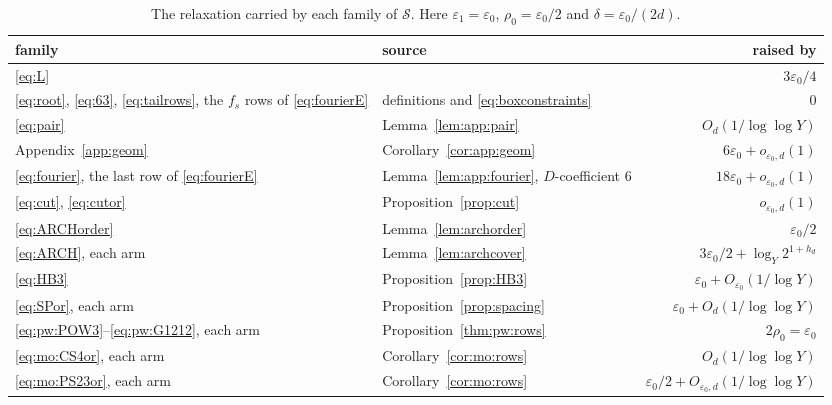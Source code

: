 \documentclass{amsart}
\theoremstyle{definition}
\theoremstyle{plain}
\numberwithin{equation}{section}
\numberwithin{table}{section}
\begin{document}
\begin{table}[ht]
\centering\small
\caption{The relaxation carried by each family of $\mathcal S$. Here
$\varepsilon_1=\varepsilon_0$, $\rho_0=\varepsilon_0/2$ and
$\delta=\varepsilon_0/(2d)$.}\label{tab:rho}
\begin{tabular}{@{}p{}p{}r@{}}
\hline family & source & raised by\\\hline
\eqref{eq:L} & \cite[(6.1)]{BBLT} & $3\varepsilon_0/4$\\
\eqref{eq:root}, \eqref{eq:63}, \eqref{eq:tailrows}, the $f_s$ rows of \eqref{eq:fourierE} & definitions and \eqref{eq:boxconstraints} & $0$\\
\eqref{eq:pair} & Lemma~\ref{lem:app:pair} & $O_d(1/\log\log Y)$\\
Appendix~\ref{app:geom} & Corollary~\ref{cor:app:geom} & $6\varepsilon_0+o_{\varepsilon_0,d}(1)$\\
\eqref{eq:fourier}, the last row of \eqref{eq:fourierE} & Lemma~\ref{lem:app:fourier}, $D$-coefficient $6$ & $18\varepsilon_0+o_{\varepsilon_0,d}(1)$\\
\eqref{eq:cut}, \eqref{eq:cutor} & Proposition~\ref{prop:cut} & $o_{\varepsilon_0,d}(1)$\\
\eqref{eq:ARCHorder} & Lemma~\ref{lem:archorder} & $\varepsilon_0/2$\\
\eqref{eq:ARCH}, each arm & Lemma~\ref{lem:archcover} & $3\varepsilon_0/2+\log_Y2^{1+h_d}$\\
\eqref{eq:HB3} & Proposition~\ref{prop:HB3} & $\varepsilon_0+O_{\varepsilon_0}(1/\log Y)$\\
\eqref{eq:SPor}, each arm & Proposition~\ref{prop:spacing} & $\varepsilon_0+O_d(1/\log\log Y)$\\
\eqref{eq:pw:POW3}--\eqref{eq:pw:G1212}, each arm & Proposition~\ref{thm:pw:rows} & $2\rho_0=\varepsilon_0$\\
\eqref{eq:mo:CS4or}, each arm & Corollary~\ref{cor:mo:rows} & $O_d(1/\log\log Y)$\\
\eqref{eq:mo:PS23or}, each arm & Corollary~\ref{cor:mo:rows} & $\varepsilon_0/2+O_{\varepsilon_0,d}(1/\log\log Y)$\\
\hline
\end{tabular}
\end{table}
\end{document}
